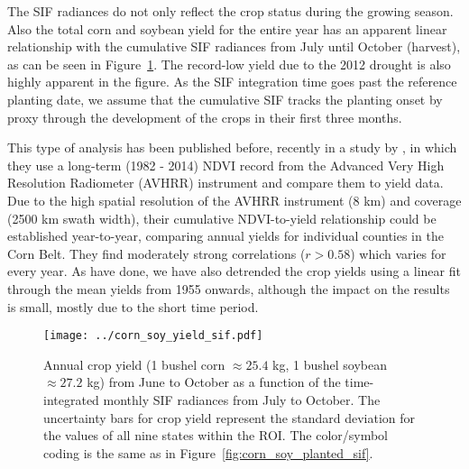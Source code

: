 \documentclass[preprint, a4paper, 10pt, times, 5p]{elsarticle}
\begin{document}
The SIF radiances do not only reflect the crop status during the growing season. Also the total corn and soybean yield for the entire year has an apparent linear relationship with the cumulative SIF radiances from July until October (harvest), as can be seen in Figure~\ref{fig:corn_soy_yield_sif}. The record-low yield due to the 2012 drought is also highly apparent in the figure. As the SIF integration time goes past the reference planting date, we assume that the cumulative SIF tracks the planting onset by proxy through the development of the crops in their first three months.

This type of analysis has been published before, recently in a study by \citet{glennie2018midwest}, in which they use a long-term (1982 - 2014) NDVI record from the Advanced Very High Resolution Radiometer (AVHRR) instrument and compare them to yield data. Due to the high spatial resolution of the AVHRR instrument (8 km) and coverage (2500 km swath width), their cumulative NDVI-to-yield relationship could be established year-to-year, comparing annual yields for individual counties in the Corn Belt. They find moderately strong correlations ($r > 0.58$) which varies for every year. As  \citet{glennie2018midwest} have done, we have also detrended the crop yields using a linear fit through the mean yields from 1955 onwards, although the impact on the results is small, mostly due to the short time period.

\begin{figure}[htbp]
\centering
\texttt{[image: ../corn\_soy\_yield\_sif.pdf]}
\caption{Annual crop yield (1 bushel corn $\approx 25.4$ kg, 1 bushel soybean $\approx 27.2$ kg) from June to October as a function of the time-integrated monthly SIF radiances from July to October. The uncertainty bars for crop yield represent the standard deviation for the values of all nine states within the ROI. The color/symbol coding is the same as in Figure~\ref{fig:corn_soy_planted_sif}.}
\label{fig:corn_soy_yield_sif}
\end{figure}
\end{document}
